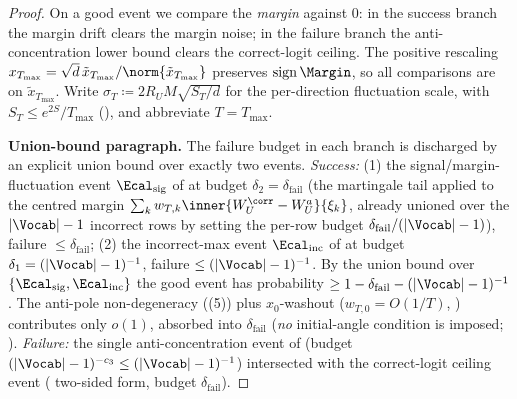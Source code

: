 \begin{proof}
On a good event we compare the \emph{margin} against $0$: in the success
branch the margin drift clears the margin noise; in the failure branch the
anti-concentration lower bound clears the correct-logit ceiling. The
positive rescaling $x_{T_{\max}}=\sqrt d\,\tilde x_{T_{\max}}/\norm{\tilde x_{T_{\max}}}$
preserves $\operatorname{sign}\Margin$, so all comparisons are on
$\tilde x_{T_{\max}}$. Write $\sigma_T\coloneqq2R_U M\sqrt{S_T/d}$ for the
per-direction fluctuation scale, with $S_T\le e^{2S}/T_{\max}$
(), and abbreviate $T=T_{\max}$.

\smallskip\noindent\textbf{Union-bound paragraph.} The failure budget in
each branch is discharged by an explicit union bound over exactly two
events. \emph{Success:} (1) the signal/margin-fluctuation event
$\Ecal_{\mathrm{sig}}$ of  at
budget $\delta_2=\delta_{\mathrm{fail}}$ (the martingale tail
 applied to the centred margin
$\sum_k w_{T,k}\inner{W_U^{\corr}-W_U^a}{\xi_k}$, already unioned over the
$|\Vocab|-1$ incorrect rows by setting the per-row budget
$\delta_{\mathrm{fail}}/(|\Vocab|-1)$), failure $\le\delta_{\mathrm{fail}}$;
(2) the incorrect-max event $\Ecal_{\mathrm{inc}}$ of
 at budget $\delta_1=(|\Vocab|-1)^{-1}$, failure
$\le(|\Vocab|-1)^{-1}$. By the union bound over
$\{\Ecal_{\mathrm{sig}},\Ecal_{\mathrm{inc}}\}$ the good event has
probability $\ge1-\delta_{\mathrm{fail}}-(|\Vocab|-1)^{-1}$. The anti-pole
non-degeneracy ((5)) plus $x_0$-washout
($w_{T,0}=O(1/T)$, ) contributes only $o(1)$,
absorbed into $\delta_{\mathrm{fail}}$ (\emph{no} initial-angle condition
is imposed; ).
\emph{Failure:} the single anti-concentration event of
 (budget $(|\Vocab|-1)^{-c_3}\le(|\Vocab|-1)^{-1}$)
intersected with the correct-logit ceiling event (
two-sided form, budget $\delta_{\mathrm{fail}}$).


\end{proof}
